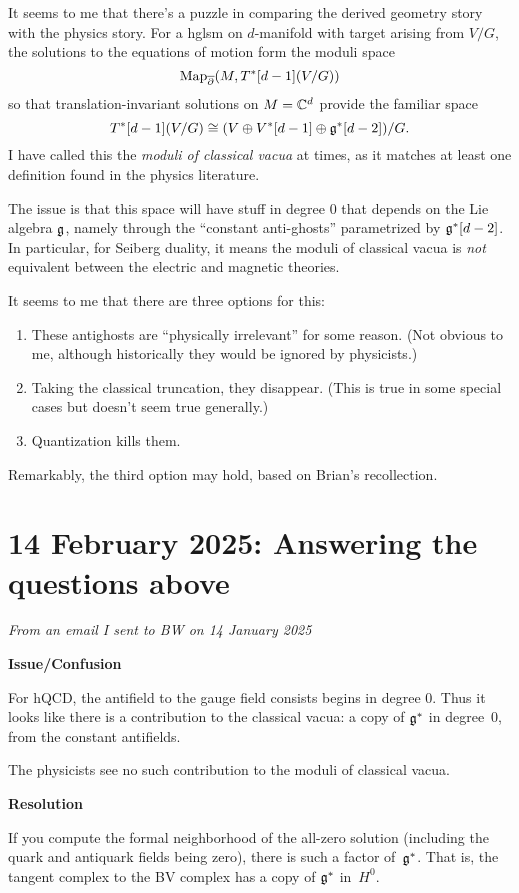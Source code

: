 \documentclass[11pt]{amsart}
\begin{document}
It seems to me that there's a puzzle in comparing the derived geometry story with the physics story.
For a hglsm on $d$-manifold with target arising from $V/G$, the solutions to the equations of motion form the moduli space
\[
{\rm Map}_{\overline{\partial}}(M, T^*[d-1](V/G))
\]
so that translation-invariant solutions on $M = \mathbb C^d$ provide the familiar space
\[
T^*[d-1](V/G) \cong (V \oplus V^*[d-1] \oplus \mathfrak g^*[d-2])/G.
\]
I have called this the {\em moduli of classical vacua} at times,
as it matches at least one definition found in the physics literature.

The issue is that this space will have stuff in degree 0 that depends on the Lie algebra $\mathfrak g$, 
namely through the ``constant anti-ghosts'' parametrized by $\mathfrak g^*[d-2]$.
In particular, for Seiberg duality,
it means the moduli of classical vacua is {\em not} equivalent between the electric and magnetic theories.

It seems to me that there are three options for this:
\begin{enumerate}
\item These antighosts are ``physically irrelevant'' for some reason. (Not obvious to me, although historically they would be ignored by physicists.)
\item Taking the classical truncation, they disappear. (This is true in some special cases but doesn't seem true generally.)
\item Quantization kills them. 
\end{enumerate}
Remarkably, the third option may hold, based on Brian's recollection. 

\section{14 February 2025: Answering the questions above}

{\em From an email I sent to BW on 14 January 2025}

{\bf Issue/Confusion}

For hQCD, the antifield to the gauge field consists begins in degree 0. Thus it looks like there is a contribution to the classical vacua: a copy of $\mathfrak g^*$ in degree~0, from the constant antifields. 

The physicists see no such contribution to the moduli of classical vacua.

{\bf Resolution}

If you compute the formal neighborhood of the all-zero solution (including the quark and antiquark fields being zero), there is such a factor of~$\mathfrak g^*$. That is, the tangent complex to the BV complex has a copy of $\mathfrak g^*$ in~$H^0$.
\end{document}
